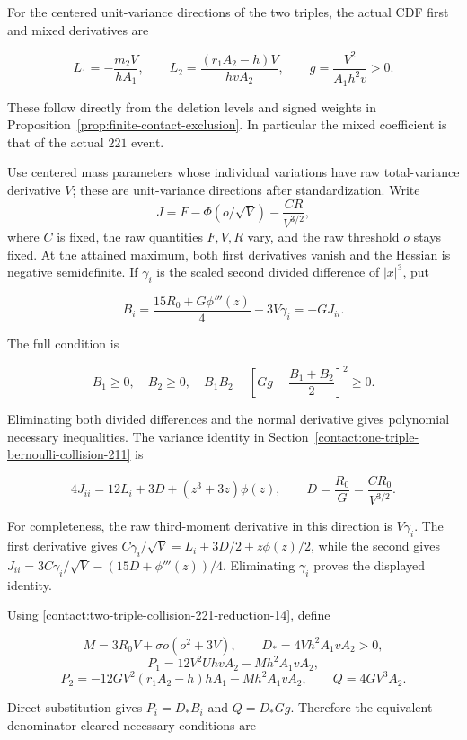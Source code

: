 For the centered unit-variance directions of the two triples, the actual CDF
first and mixed derivatives are

\[
 L_1=-\frac{m_2V}{hA_1},\qquad
 L_2=\frac{(r_1A_2-h)V}{hvA_2},\qquad
 g=\frac{V^2}{A_1h^2v}>0.
\tag{B.31.19}\label{contact:two-triple-collision-221-reduction-19}
\]

These follow directly from the deletion levels and signed weights in
Proposition~\ref{prop:finite-contact-exclusion}.
In particular the mixed coefficient is that of the actual $221$ event.

Use centered mass parameters whose individual variations have raw
total-variance derivative $V$; these are unit-variance directions
after standardization. Write
\[
 J=F-\Phi(o/\sqrt V)-\frac{CR}{V^{3/2}},
\]
where $C$ is fixed, the raw quantities $F,V,R$ vary, and the raw
threshold $o$ stays fixed.
At the attained maximum, both first derivatives vanish and the Hessian is
negative semidefinite. If $\gamma_i$ is the scaled second divided difference
of $|x|^3$, put

\[
 B_i=\frac{15R_0+G\phi'''(z)}4-3V\gamma_i=-GJ_{ii}.
\]

The full condition is

\[
 B_1\geq0,\quad B_2\geq0,\quad
 B_1B_2-\left[Gg-\frac{B_1+B_2}{2}\right]^2\geq0.
\tag{B.31.20}\label{contact:two-triple-collision-221-reduction-20}
\]

Eliminating both divided differences and the normal derivative gives polynomial necessary inequalities. The variance identity
in Section~\ref{contact:one-triple-bernoulli-collision-211}
is

\[
 4J_{ii}=12L_i+3D+(z^3+3z)\phi(z),
 \qquad D=\frac{R_0}{G}=\frac{CR_0}{V^{3/2}}.
\]

For completeness, the raw third-moment derivative in this direction is
$V\gamma_i$. The first derivative gives
$C\gamma_i/\sqrt V=L_i+3D/2+z\phi(z)/2$, while the second gives
$J_{ii}=3C\gamma_i/\sqrt V-(15D+\phi'''(z))/4$.
Eliminating $\gamma_i$ proves the displayed identity.

Using \eqref{contact:two-triple-collision-221-reduction-14}, define

\[
 M=3R_0V+\sigma o(o^2+3V),\qquad
 D_*=4Vh^2A_1vA_2>0,
\]
\[
 P_1=12V^2Uh vA_2-Mh^2A_1vA_2,
\]
\[
 P_2=-12GV^2(r_1A_2-h)hA_1-Mh^2A_1vA_2,
 \qquad Q=4GV^3A_2.
\tag{B.31.21}\label{contact:two-triple-collision-221-reduction-21}
\]

Direct substitution gives $P_i=D_*B_i$ and $Q=D_*Gg$. Therefore the
equivalent denominator-cleared necessary conditions are


